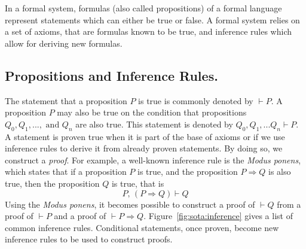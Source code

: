 In a formal system, formulas (also called propositions) of a formal language
represent statements which can either be true or false.
%
A formal system relies on a set of axioms, that are formulas known to be true,
and inference rules which allow for deriving new formulas.



\subsection{Propositions and Inference Rules.}
%
The statement that a proposition \( P \) is true is commonly denoted by
\( \vdash P \).
%
A proposition \( P \) may also be true on the condition that propositions
\( Q_0, Q_1, ..., \text{ and } Q_n \) are also true.
%
This statement is denoted by \( Q_0, Q_1, ... Q_n \vdash P \).
%
A statement is proven true when it is part of the base of axioms or if we use
inference rules to derive it from already proven statements.
%
By doing so, we construct a \emph{proof}.
%
For example, a well-known inference rule is the \emph{Modus ponens}, which
states that if a proposition \( P \) is true, and the proposition
\( P \Rightarrow Q \) is also true, then the proposition \( Q \) is true, that
is
%
\[
  P\text{, }(P \Rightarrow Q) \vdash Q
\]
%
Using the \emph{Modus ponens}, it becomes possible to construct a proof of
\( \vdash Q \) from a proof of \( \vdash P \) and a proof of
\( \vdash P \Rightarrow Q \).
%
Figure~\ref{fig:sota:inference} gives a list of common inference rules.
%
Conditional statements, once proven, become new inference rules to be used to
construct proofs.

